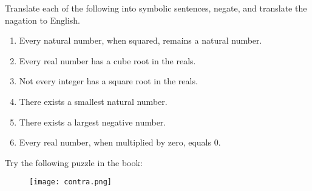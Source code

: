 \documentclass[12pt]{amsart}
\begin{document}
\begin{problem}
Translate each of the following into symbolic sentences, negate, and translate the nagation to English.

\begin{enumerate}
	\item Every natural number, when squared, remains a natural number.
	      \vspace{3cm}
	\item Every real number has a cube root in the reals.
	      \vspace{3cm}
	\item Not every integer has a square root in the reals.
	      \vspace{3cm}
	\item There exists a smallest natural number.
	      \vspace{3cm}
	\item There exists a largest negative number.
	      \vspace{3cm}
	\item Every real number, when multiplied by zero, equals 0.
	      \vspace{3cm}
\end{enumerate}
\end{problem}


\begin{problem}
Try the following puzzle in the book:
\begin{figure}[ht]
	\begin{center}
		\texttt{[image: contra.png]}
	\end{center}
\end{figure}

\end{problem}
\end{document}
